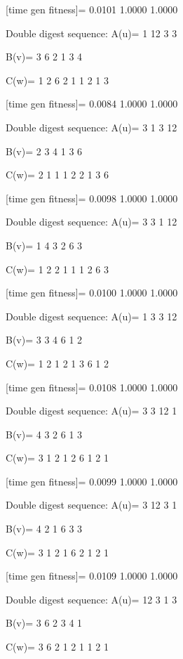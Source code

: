 [time gen fitness]=
    0.0101    1.0000    1.0000

Double digest sequence:
A(u)=
     1    12     3     3

B(v)=
     3     6     2     1     3     4

C(w)=
     1     2     6     2     1     1     2     1     3

[time gen fitness]=
    0.0084    1.0000    1.0000

Double digest sequence:
A(u)=
     3     1     3    12

B(v)=
     2     3     4     1     3     6

C(w)=
     2     1     1     1     2     2     1     3     6

[time gen fitness]=
    0.0098    1.0000    1.0000

Double digest sequence:
A(u)=
     3     3     1    12

B(v)=
     1     4     3     2     6     3

C(w)=
     1     2     2     1     1     1     2     6     3

[time gen fitness]=
    0.0100    1.0000    1.0000

Double digest sequence:
A(u)=
     1     3     3    12

B(v)=
     3     3     4     6     1     2

C(w)=
     1     2     1     2     1     3     6     1     2

[time gen fitness]=
    0.0108    1.0000    1.0000

Double digest sequence:
A(u)=
     3     3    12     1

B(v)=
     4     3     2     6     1     3

C(w)=
     3     1     2     1     2     6     1     2     1

[time gen fitness]=
    0.0099    1.0000    1.0000

Double digest sequence:
A(u)=
     3    12     3     1

B(v)=
     4     2     1     6     3     3

C(w)=
     3     1     2     1     6     2     1     2     1

[time gen fitness]=
    0.0109    1.0000    1.0000

Double digest sequence:
A(u)=
    12     3     1     3

B(v)=
     3     6     2     3     4     1

C(w)=
     3     6     2     1     2     1     1     2     1

